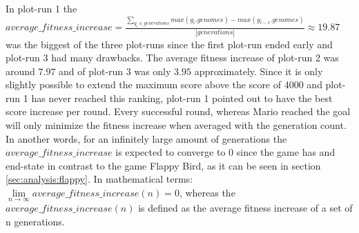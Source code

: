 			In plot-run 1 the $average\_fitness\_increase =  \frac{\sum\nolimits_{g_i \in generations} max(g_i.genomes) - max(g_{i-1}.genomes)}{|generations|}\approx19.87$ was the biggest of the three plot-runs since the first plot-run ended early and plot-run 3 had many drawbacks. The average fitness increase of plot-run 2 was around $7.97$ and of plot-run 3 was only $3.95$ approximately. Since it is only slightly possible to extend the maximum score above the score of 4000 and plot-run 1 has never reached this ranking, plot-run 1 pointed out to have the best score increase per round. Every successful round, whereas Mario reached the goal will only minimize the fitness increase when averaged with the generation count. In another words, for an infinitely large amount of generations the $average\_fitness\_increase$ is expected to converge to $0$ since the game has and end-state in contrast to the game Flappy Bird, as it can be seen in section \ref{sec:analysis:flappy}. In mathematical terms: $\lim\limits_{n \to \infty} average\_fitness\_increase(n) = 0$, whereas the $average\_fitness\_increase(n)$ is defined as the average fitness increase of a set of n generations.
		
